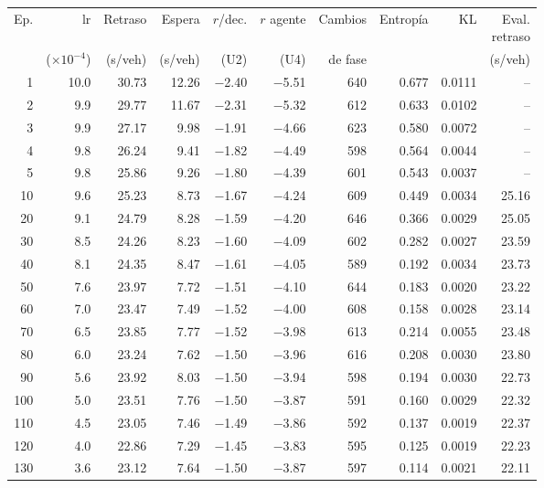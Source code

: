 \begin{table}[H]
\centering
\scriptsize
\setlength{\tabcolsep}{3pt}
\setlength{\tabcolsep}{2pt}
\begin{tabular}{rrrrrrrrrr}
\toprule
Ep. & lr & Retraso & Espera & $r$/dec. & $r$ agente & Cambios & Entropía & KL & \makecell{Eval.\\retraso} \\
 & ($\times 10^{-4}$) & (s/veh) & (s/veh) & (U2) & (U4) & de fase &  &  & (s/veh) \\
\midrule
1 & 10.0 & 30.73 & 12.26 & $-$2.40 & $-$5.51 & 640 & 0.677 & 0.0111 & -- \\
2 & 9.9 & 29.77 & 11.67 & $-$2.31 & $-$5.32 & 612 & 0.633 & 0.0102 & -- \\
3 & 9.9 & 27.17 & 9.98 & $-$1.91 & $-$4.66 & 623 & 0.580 & 0.0072 & -- \\
4 & 9.8 & 26.24 & 9.41 & $-$1.82 & $-$4.49 & 598 & 0.564 & 0.0044 & -- \\
5 & 9.8 & 25.86 & 9.26 & $-$1.80 & $-$4.39 & 601 & 0.543 & 0.0037 & -- \\
10 & 9.6 & 25.23 & 8.73 & $-$1.67 & $-$4.24 & 609 & 0.449 & 0.0034 & 25.16 \\
20 & 9.1 & 24.79 & 8.28 & $-$1.59 & $-$4.20 & 646 & 0.366 & 0.0029 & 25.05 \\
30 & 8.5 & 24.26 & 8.23 & $-$1.60 & $-$4.09 & 602 & 0.282 & 0.0027 & 23.59 \\
40 & 8.1 & 24.35 & 8.47 & $-$1.61 & $-$4.05 & 589 & 0.192 & 0.0034 & 23.73 \\
50 & 7.6 & 23.97 & 7.72 & $-$1.51 & $-$4.10 & 644 & 0.183 & 0.0020 & 23.22 \\
60 & 7.0 & 23.47 & 7.49 & $-$1.52 & $-$4.00 & 608 & 0.158 & 0.0028 & 23.14 \\
70 & 6.5 & 23.85 & 7.77 & $-$1.52 & $-$3.98 & 613 & 0.214 & 0.0055 & 23.48 \\
80 & 6.0 & 23.24 & 7.62 & $-$1.50 & $-$3.96 & 616 & 0.208 & 0.0030 & 23.80 \\
90 & 5.6 & 23.92 & 8.03 & $-$1.50 & $-$3.94 & 598 & 0.194 & 0.0030 & 22.73 \\
100 & 5.0 & 23.51 & 7.76 & $-$1.50 & $-$3.87 & 591 & 0.160 & 0.0029 & 22.32 \\
110 & 4.5 & 23.05 & 7.46 & $-$1.49 & $-$3.86 & 592 & 0.137 & 0.0019 & 22.37 \\
120 & 4.0 & 22.86 & 7.29 & $-$1.45 & $-$3.83 & 595 & 0.125 & 0.0019 & 22.23 \\
130 & 3.6 & 23.12 & 7.64 & $-$1.50 & $-$3.87 & 597 & 0.114 & 0.0021 & 22.11 \\

\end{tabular}
\end{table}
